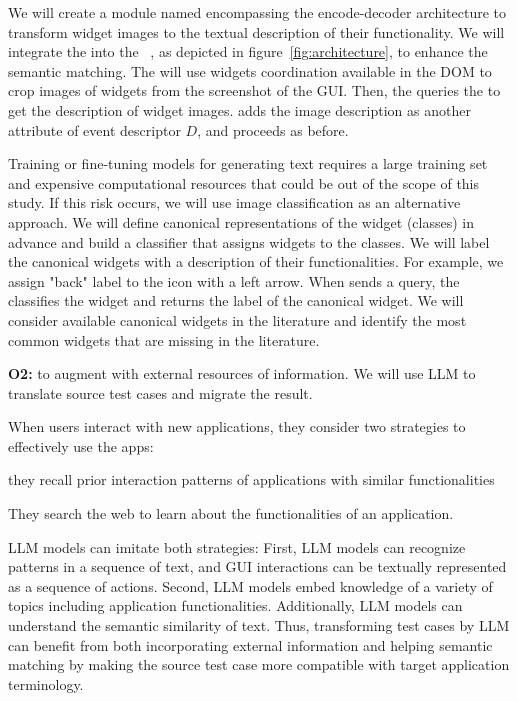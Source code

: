\bigskip
We will create a module named \imagelabeler encompassing the encode-decoder architecture to transform widget images to the textual description of their functionality.
We will integrate the \imagelabeler into the \testreuse~\architecture, as depicted in figure~\ref{fig:architecture}, to enhance the semantic matching.
The \ede  will use widgets coordination available in the DOM to crop images of widgets from the screenshot of the GUI.
Then, the \ede queries the \imagelabeler to get the description of  widget images.
\ede adds the image description as another attribute of event descriptor $D$, and \matcher proceeds as before.


\bigskip
Training or fine-tuning models for generating text requires a large training set and expensive computational resources that could be out of the scope of this study. 
If this risk occurs, we will use image classification as an alternative approach.
We will define canonical representations of the widget  (classes) in advance and build a classifier that assigns widgets to the classes.
We will label the canonical widgets with a description of their functionalities.
For example, we assign "back" label to the icon with a left arrow.
When \ede sends a query, the \imagelabeler classifies the widget and returns the label of the canonical widget.
We will consider available canonical widgets in the literature and identify the most common widgets that are missing in the literature. 




\bigskip
\noindent
\textbf{O2:} to augment \testreuse with external resources of information.
We will use LLM to translate source test cases and migrate the result.

\bigskip
When users interact with new applications, they consider two strategies to effectively use the apps:
\begin{inparaenum}[a)]
\item they recall prior  interaction patterns of  applications with similar functionalities
\item They search the web to learn about the functionalities of an application.
\end{inparaenum}
LLM models can imitate both strategies:
First, LLM models can recognize patterns in a sequence of text, and GUI interactions can be textually represented as a sequence of actions. 
Second, LLM models embed knowledge of a variety of topics including application functionalities.
Additionally, LLM models can understand the semantic similarity of text. 
Thus, transforming test cases by LLM can benefit from both incorporating external information and helping semantic matching by making the source test case more compatible with target application terminology.



